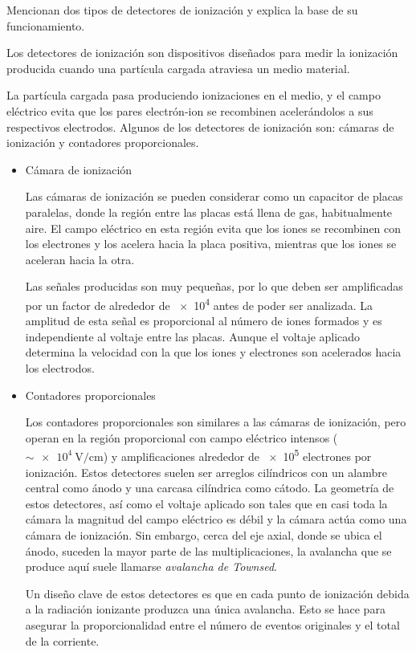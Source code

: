 \documentclass[./../main.tex]{subfiles}
\begin{document}
    \begin{exercise}
        Mencionan dos tipos de detectores de ionización y explica la base de su funcionamiento.

        \begin{solution}
            
            Los detectores de ionización son dispositivos diseñados para medir la ionización producida cuando una partícula cargada atraviesa un medio material.

            La partícula cargada pasa produciendo ionizaciones en el medio, y el campo eléctrico evita que los pares electrón-ion se recombinen acelerándolos a sus respectivos electrodos. Algunos de los detectores de ionización son: cámaras de ionización y contadores proporcionales.

            \begin{itemize}
                \item Cámara de ionización
                
                Las cámaras de ionización se pueden considerar como un capacitor de placas paralelas, donde la región entre las placas está llena de gas, habitualmente aire. El campo eléctrico en esta región evita que los iones se recombinen con los electrones y los acelera hacia la placa positiva, mientras que los iones se aceleran hacia la otra.

                Las señales producidas son muy pequeñas, por lo que deben ser amplificadas por un factor de alrededor de \num{e4} antes de poder ser analizada. La amplitud de esta señal es proporcional al número de iones formados y es independiente al voltaje entre las placas. Aunque el voltaje aplicado determina la velocidad con la que los iones y electrones son acelerados hacia los electrodos.
                
                \item Contadores proporcionales
                
                Los contadores proporcionales son similares a las cámaras de ionización, pero operan en la región proporcional con campo eléctrico intensos (\(\sim \qty{e4}{\V\per\cm}\)) y amplificaciones alrededor de \num{e5} electrones por ionización. Estos detectores suelen ser arreglos cilíndricos con un alambre central como ánodo y una carcasa cilíndrica como cátodo. La geometría de estos detectores, así como el voltaje aplicado son tales que en casi toda la cámara la magnitud del campo eléctrico es débil y la cámara actúa como una cámara de ionización. Sin embargo, cerca del eje axial, donde se ubica el ánodo, suceden la mayor parte de las multiplicaciones, la avalancha que se produce aquí suele llamarse \emph{avalancha de Townsed}.

                Un diseño clave de estos detectores es que en cada punto de ionización debida a la radiación ionizante produzca una única avalancha. Esto se hace para asegurar la proporcionalidad entre el número de eventos originales y el total de la corriente.
            \end{itemize}
        \end{solution}
    \end{exercise}
\end{document}
